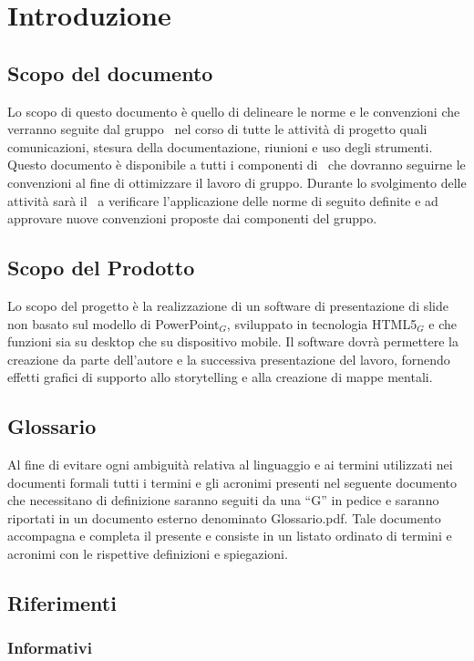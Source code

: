 \section{Introduzione}

\subsection{Scopo del documento}
Lo scopo di questo documento è quello di delineare le norme e le convenzioni che verranno seguite dal gruppo \gruppo\ nel corso di tutte le attività di progetto quali comunicazioni, stesura della documentazione, riunioni e uso degli strumenti.
Questo documento è disponibile a tutti i componenti di \gruppo\ che dovranno seguirne le convenzioni al fine di ottimizzare il lavoro di gruppo.
Durante lo svolgimento delle attività sarà il \ruoloResponsabile\ a verificare l’applicazione delle norme di seguito definite e ad approvare nuove convenzioni proposte dai componenti del gruppo.

\subsection{Scopo del Prodotto}
Lo scopo del progetto è la realizzazione di un software di presentazione di slide non basato sul modello di PowerPoint$_G$, sviluppato in tecnologia HTML5$_G$ e che funzioni sia su desktop che su dispositivo mobile. Il software dovrà permettere la creazione da parte dell'autore e la successiva presentazione del lavoro, fornendo effetti grafici di supporto allo storytelling e alla creazione di mappe mentali. 

\subsection{Glossario}
Al fine di evitare ogni ambiguità relativa al linguaggio e ai termini utilizzati nei documenti formali tutti i termini e gli acronimi presenti nel seguente documento che necessitano di definizione saranno seguiti da una ``G'' in pedice e saranno riportati in un documento esterno denominato Glossario.pdf. Tale documento accompagna e completa il presente e consiste in un listato ordinato di termini e acronimi con le rispettive definizioni e spiegazioni.

\subsection{Riferimenti}
\subsubsection{Informativi}

